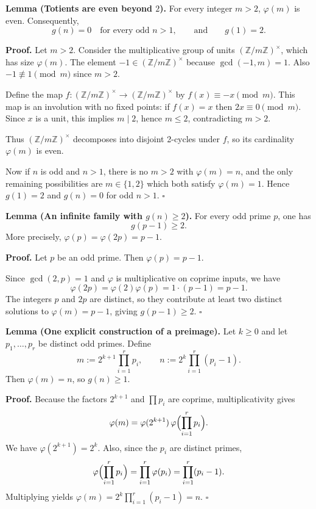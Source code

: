 \noindent\textbf{Lemma (Totients are even beyond $2$).}
For every integer $m>2$, $\varphi(m)$ is even. Consequently,
\[
 g(n)=0\quad\text{for every odd }n>1,\qquad\text{and}\qquad g(1)=2.
\]

\noindent\textbf{Proof.}
Let $m>2$. Consider the multiplicative group of units $(\mathbb{Z}/m\mathbb{Z})^\times$, which has size $\varphi(m)$. The element $-1\in(\mathbb{Z}/m\mathbb{Z})^\times$ because $\gcd(-1,m)=1$. Also $-1\not\equiv 1\pmod m$ since $m>2$.

Define the map $f:(\mathbb{Z}/m\mathbb{Z})^\times\to(\mathbb{Z}/m\mathbb{Z})^\times$ by $f(x)\equiv -x\pmod m$. This map is an involution with no fixed points: if $f(x)=x$ then $2x\equiv 0\pmod m$. Since $x$ is a unit, this implies $m\mid 2$, hence $m\le 2$, contradicting $m>2$.

Thus $(\mathbb{Z}/m\mathbb{Z})^\times$ decomposes into disjoint 2-cycles under $f$, so its cardinality $\varphi(m)$ is even.

Now if $n$ is odd and $n>1$, there is no $m>2$ with $\varphi(m)=n$, and the only remaining possibilities are $m\in\{1,2\}$ which both satisfy $\varphi(m)=1$. Hence $g(1)=2$ and $g(n)=0$ for odd $n>1$.
\hfill$\square$


\noindent\textbf{Lemma (An infinite family with $g(n)\ge 2$).}
For every odd prime $p$, one has
\[
 g(p-1)\ge 2.
\]
More precisely, $\varphi(p)=\varphi(2p)=p-1$.

\noindent\textbf{Proof.}
Let $p$ be an odd prime. Then $\varphi(p)=p-1$.

Since $\gcd(2,p)=1$ and $\varphi$ is multiplicative on coprime inputs, we have
\[
\varphi(2p)=\varphi(2)\varphi(p)=1\cdot (p-1)=p-1.
\]
The integers $p$ and $2p$ are distinct, so they contribute at least two distinct solutions to $\varphi(m)=p-1$, giving $g(p-1)\ge 2$.
\hfill$\square$


\noindent\textbf{Lemma (One explicit construction of a preimage).}
Let $k\ge 0$ and let $p_1,\dots,p_r$ be distinct odd primes. Define
\[
 m := 2^{k+1}\prod_{i=1}^r p_i,\qquad n := 2^k\prod_{i=1}^r (p_i-1).
\]
Then $\varphi(m)=n$, so $g(n)\ge 1$.

\noindent\textbf{Proof.}
Because the factors $2^{k+1}$ and $\prod p_i$ are coprime, multiplicativity gives
\[
\varphi(m)=\varphi(2^{k+1})\,\varphi\Bigl(\prod_{i=1}^r p_i\Bigr).
\]
We have $\varphi(2^{k+1})=2^k$. Also, since the $p_i$ are distinct primes,
\[
\varphi\Bigl(\prod_{i=1}^r p_i\Bigr)=\prod_{i=1}^r \varphi(p_i)=\prod_{i=1}^r (p_i-1).
\]
Multiplying yields $\varphi(m)=2^k\prod_{i=1}^r (p_i-1)=n$.
\hfill$\square$


